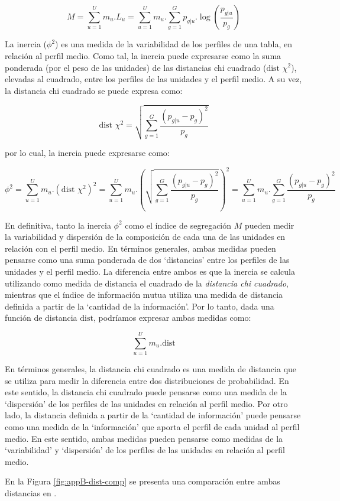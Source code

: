 \documentclass[
  spanish,
  a4paper,%
  chapterprefix=true,%
  DIV=calc,%
  twoside]{scrbook}%
\begin{document}
\[
M = \sum_{u=1}^U m_u . L_u = \sum_{u=1}^U m_u . \sum_{g=1}^G p_{g|u}.\log({\frac{p_{g|u}}{p_{g}}}) 
\]

La inercia (\(\phi^2\)) es una medida de la variabilidad de los perfiles de una tabla, en relación al perfil medio. Como tal, la inercia puede expresarse como la suma ponderada (por el peso de las unidades) de las distancias chi cuadrado (\(\text{dist }\chi^2\)), elevadas al cuadrado, entre los perfiles de las unidades y el perfil medio. A su vez, la distancia chi cuadrado se puede expresa como:

\[
\text{dist } \chi^2 = \sqrt{\sum_{g=1}^G \frac{(p_{g|u} - p_{g})^2}{p_{g}}}
\]

por lo cual, la inercia puede expresarse como:

\[
\phi^2 = \sum_{u=1}^U m_u . (\text{dist }\chi^2)^2 = \sum_{u=1}^U m_u . \left( \sqrt{\sum_{g=1}^G \frac{(p_{g|u} - p_{g})^2}{p_{g}}} \right)^2 = \sum_{u=1}^U m_u . \sum_{g=1}^G \frac{(p_{g|u} - p_{g})^2}{p_{g}}
\]

En definitiva, tanto la inercia \(\phi^2\) como el índice de segregación \(M\) pueden medir la variabilidad y dispersión de la composición de cada una de las unidades en relación con el perfil medio. En términos generales, ambas medidas pueden pensarse como una suma ponderada de dos `distancias' entre los perfiles de las unidades y el perfil medio. La diferencia entre ambos es que la inercia se calcula utilizando como medida de distancia el cuadrado de la \emph{distancia chi cuadrado}, mientras que el índice de información mutua utiliza una medida de distancia definida a partir de la `cantidad de la información'. Por lo tanto, dada una función de distancia \(\text{dist}\), podríamos expresar ambas medidas como:

\[
\sum_{u=1}^U m_u . \text{dist}
\]

En términos generales, la distancia chi cuadrado es una medida de distancia que se utiliza para medir la diferencia entre dos distribuciones de probabilidad. En este sentido, la distancia chi cuadrado puede pensarse como una medida de la `dispersión' de los perfiles de las unidades en relación al perfil medio. Por otro lado, la distancia definida a partir de la `cantidad de información' puede pensarse como una medida de la `información' que aporta el perfil de cada unidad al perfil medio. En este sentido, ambas medidas pueden pensarse como medidas de la `variabilidad' y `dispersión' de los perfiles de las unidades en relación al perfil medio.

En la Figura \ref{fig:appB-dist-comp} se presenta una comparación entre ambas distancias en .
\end{document}
